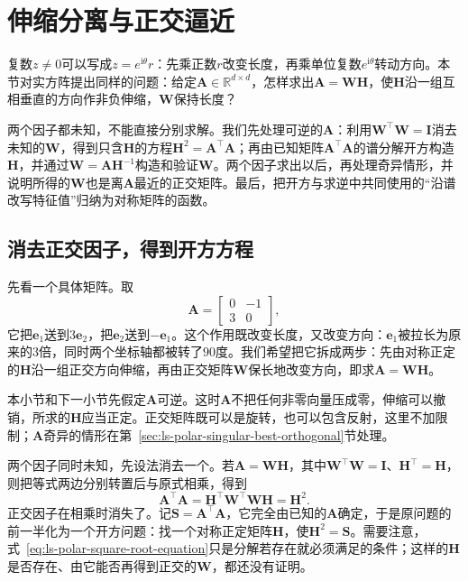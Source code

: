 
\section{伸缩分离与正交逼近}
\label{sec:ls-polar-decomposition}

复数$z\neq0$可以写成$z=e^{\mathrm i\theta}r$：先乘正数$r$改变长度，再乘单位复数$e^{\mathrm i\theta}$转动方向。本节对实方阵提出同样的问题：给定$\bm A\in\mathbb R^{d\times d}$，怎样求出$\bm A=\bm W\bm H$，使$\bm H$沿一组互相垂直的方向作非负伸缩，$\bm W$保持长度？

两个因子都未知，不能直接分别求解。我们先处理可逆的$\bm A$：利用$\bm W^\top\bm W=\bm I$消去未知的$\bm W$，得到只含$\bm H$的方程$\bm H^2=\bm A^\top\bm A$；再由已知矩阵$\bm A^\top\bm A$的谱分解开方构造$\bm H$，并通过$\bm W=\bm A\bm H^{-1}$构造和验证$\bm W$。两个因子求出以后，再处理奇异情形，并说明所得的$\bm W$也是离$\bm A$最近的正交矩阵。最后，把开方与求逆中共同使用的“沿谱改写特征值”归纳为对称矩阵的函数。

\subsection{消去正交因子，得到开方方程}
\label{sec:ls-polar-square-root-equation}

先看一个具体矩阵。取
\[
 \bm A=\begin{bmatrix}0&-1\\3&0\end{bmatrix},
\]
它把$\bm e_1$送到$3\bm e_2$，把$\bm e_2$送到$-\bm e_1$。这个作用既改变长度，又改变方向：$\bm e_1$被拉长为原来的$3$倍，同时两个坐标轴都被转了$90$度。我们希望把它拆成两步：先由对称正定的$\bm H$沿一组正交方向伸缩，再由正交矩阵$\bm W$保长地改变方向，即求$\bm A=\bm W\bm H$。

本小节和下一小节先假定$\bm A$可逆。这时$\bm A$不把任何非零向量压成零，伸缩可以撤销，所求的$\bm H$应当正定。正交矩阵既可以是旋转，也可以包含反射，这里不加限制；$\bm A$奇异的情形在第~\ref{sec:ls-polar-singular-best-orthogonal}节处理。

两个因子同时未知，先设法消去一个。若$\bm A=\bm W\bm H$，其中$\bm W^\top\bm W=\bm I$、$\bm H^\top=\bm H$，则把等式两边分别转置后与原式相乘，得到
\begin{equation}
 \bm A^\top\bm A
 =\bm H^\top\bm W^\top\bm W\bm H
 =\bm H^2 .
 \label{eq:ls-polar-square-root-equation}
\end{equation}
正交因子在相乘时消失了。记$\bm S=\bm A^\top\bm A$，它完全由已知的$\bm A$确定，于是原问题的前一半化为一个开方问题：找一个对称正定矩阵$\bm H$，使$\bm H^2=\bm S$。需要注意，式~\eqref{eq:ls-polar-square-root-equation}只是分解若存在就必须满足的条件；这样的$\bm H$是否存在、由它能否再得到正交的$\bm W$，都还没有证明。


